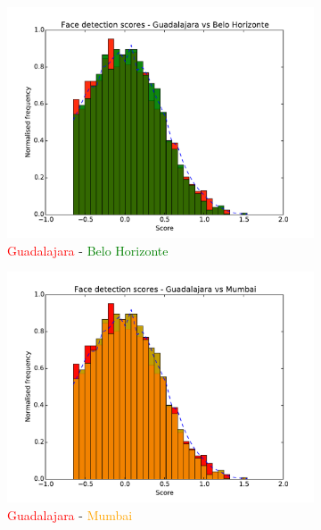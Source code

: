 \begin{figure}
    \centering
    \begin{subfigure}[b]{0.49\textwidth}
      \includegraphics[width=\textwidth]{figures/results/scores_hist_Guadalajara_Belo_Horizonte}
      \caption{\textcolor{red}{Guadalajara} - \textcolor{green}{Belo Horizonte}}
    \end{subfigure}
    \begin{subfigure}[b]{0.49\textwidth}
      \includegraphics[width=\textwidth]{figures/results/scores_hist_Guadalajara_Mumbai}
      \caption{\textcolor{red}{Guadalajara} - \textcolor{orange}{Mumbai}}
    \end{subfigure}
    \begin{subfigure}[b]{0.49\textwidth}

\end{subfigure}
\end{figure}
